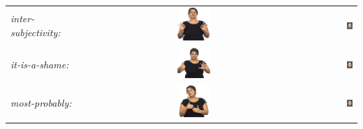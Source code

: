 \documentclass[../../main]{subfiles}
\begin{document}
\begin{longtable}{|l|c|r|}
    \emph{inter-subjectivity:} & \includegraphics[width=0.15\textwidth]{chapters/facial_expressions/images/original_facial_expressions/inter_subjectivity.png} & \includegraphics[width=0.15\textwidth]{chapters/facial_expressions/images/synthesized_expressions/inter_subjectivity.png} \\
    \emph{it-is-a-shame:} & \includegraphics[width=0.15\textwidth]{chapters/facial_expressions/images/original_facial_expressions/it_is_a_shame.png} & \includegraphics[width=0.15\textwidth]{chapters/facial_expressions/images/synthesized_expressions/it_is_a_shame.png} \\
    \emph{most-probably:} & \includegraphics[width=0.15\textwidth]{chapters/facial_expressions/images/original_facial_expressions/most_probably.png} & \includegraphics[width=0.15\textwidth]{chapters/facial_expressions/images/synthesized_expressions/most_probably.png} \\

\end{longtable}
\end{document}
